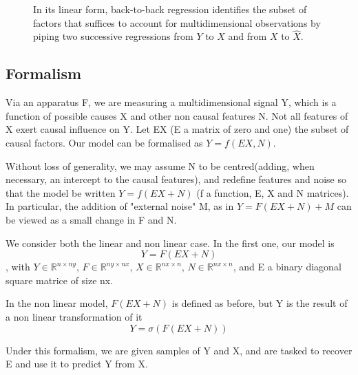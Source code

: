 \documentclass{article}
\begin{document}
\begin{figure}[t!]
    \caption{In its linear form, back-to-back regression identifies the subset of factors that suffices to account for multidimensional observations by piping two successive regressions from $Y$ to $X$ and from $X$ to $\hat X$. }
    \label{fig:}
\end{figure}

\subsection{Formalism}
Via an apparatus F, we are measuring a multidimensional signal Y, which is a function of possible causes X and other non causal features N. Not all features of X exert causal influence on Y. Let EX (E a matrix of zero and one) the subset of causal factors. Our model can be formalised as $Y=f(EX,N)$. 

Without loss of generality, we may assume N to be centred(adding, when necessary, an intercept to the causal features), and redefine features and noise so that the model be written $Y=f(EX+N)$ (f a function, E, X and N matrices). In particular, the addition of "external noise" M, as in $Y=F(EX+N)+M$ can be viewed as a small change in F and N.

We consider both the linear and non linear case. In the first one, our model is $$Y = F(EX+N)$$, with  $Y\in\mathbb{R}^{n\times ny}$, $F\in\mathbb{R}^{ny\times nx}$, $X\in\mathbb{R}^{nx\times n}$, $N\in\mathbb{R}^{nx\times n}$, and E a binary diagonal square matrice of size nx. 

In the non linear model, $F(EX+N)$ is defined as before, but Y is the result of a non linear transformation of it $$Y=\sigma (F(EX+N))$$

Under this formalism, we are given samples of Y and X, and are tasked to recover E and use it to predict Y from X.
\end{document}
